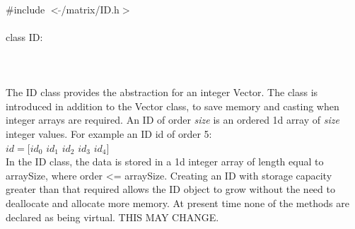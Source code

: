 
   \\
\indent \#include $<\tilde{ }$/matrix/ID.h$>$  \\

  \\
\indent class ID:  \\

 \\
 \\

  \\
\indent The ID class provides the abstraction for an integer Vector. 
The class is introduced in addition to the Vector class, to save memory
and casting when integer arrays are required. An ID of order {\em
size} is an ordered 1d array of {\em size} integer values. For example
an ID id of order 5:  \\

\indent\indent $id = [id_0$ $id_1$ $id_2$ $id_3$ $id_4]$ \\

In the ID class, the data is stored in a 1d integer array of length
equal to arraySize, where order <= arraySize. Creating an ID with
storage capacity greater than that required allows the ID object to
grow without the need to deallocate and allocate more memory. At
present time none of the methods are declared as being virtual. THIS
MAY CHANGE. \\

